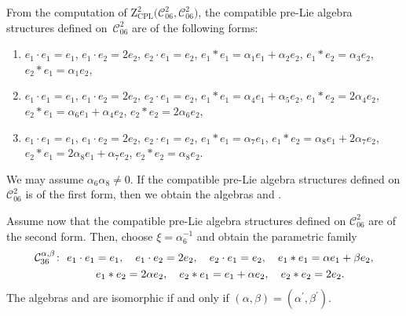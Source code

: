 \documentclass[pdftex]{sigma}
\numberwithin{equation}{section}
\begin{document}
From the computation of $\mathrm{Z}_{\mathrm{CPL}}^{2}\bigl(\mathcal{C}_{06}^{2},%
\mathcal{C}_{06}^{2}\bigr)$, the compatible pre-Lie algebra structures defined on~$\mathcal{C}_{06}^{2}$ are of the following forms:
\begin{enumerate}\itemsep=0pt
\item[(1)] $e_{1}\cdot e_{1}=e_{1}$, $e_{1}\cdot e_{2}=2e_{2}$, $e_{2}\cdot
e_{1}=e_{2}$,
$e_{1}\ast e_{1}=\alpha _{1}e_{1}+\alpha _{2}e_{2}$, $e_{1}\ast
e_{2}=\alpha _{3}e_{2}$, $e_{2}\ast e_{1}=\alpha _{1}e_{2}$,

\item[(2)] $e_{1}\cdot e_{1}=e_{1}$, $e_{1}\cdot e_{2}=2e_{2}$, $e_{2}\cdot
e_{1}=e_{2}$, $e_{1}\ast e_{1}=\alpha _{4}e_{1}+\alpha _{5}e_{2}$, $e_{1}\ast
e_{2}=2\alpha _{4}e_{2}$, $e_{2}\ast e_{1}=\alpha _{6}e_{1}+\alpha
_{4}e_{2}$, $e_{2}\ast e_{2}=2\alpha _{6}e_{2}$,

\item[(3)] $e_{1}\cdot e_{1}=e_{1}$, $e_{1}\cdot e_{2}=2e_{2}$, $e_{2}\cdot
e_{1}=e_{2}$,
$e_{1}\ast e_{1}=\alpha _{7}e_{1}$, $e_{1}\ast e_{2}=\alpha
_{8}e_{1}+2\alpha _{7}e_{2}$, $e_{2}\ast e_{1}=2\alpha _{8}e_{1}+\alpha
_{7}e_{2}$, $e_{2}\ast e_{2}=\alpha _{8}e_{2}$.
\end{enumerate}

We may assume $\alpha _{6}\alpha _{8}\neq 0$.
If the compatible pre-Lie
algebra structures defined on $\mathcal{C}_{06}^{2}$ is of the first form,
then we obtain the algebras 
and .

Assume now that the
compatible pre-Lie algebra structures defined on $\mathcal{C}_{06}^{2}$ are
of the second form. Then, choose $\xi ={\alpha^{-1} _{6}}$ and obtain the
parametric family
\begin{gather*}
\mathcal{C}_{36}^{\alpha ,\beta } \colon \
e_{1}\cdot e_{1}=e_{1}, \quad e_{1}\cdot e_{2}=2e_{2}, \quad e_{2}\cdot
e_{1}=e_{2}, \quad e_{1}\ast e_{1}=\alpha e_{1}+\beta e_{2}, \\
\hphantom{\mathcal{C}_{36}^{\alpha ,\beta } \colon} \
 e_{1}\ast e_{2}=2\alpha e_{2}, \quad e_{2}\ast e_{1}=e_{1}+\alpha e_{2}, \quad e_{2}\ast e_{2}=2e_{2}.
\end{gather*}
The algebras \smash{$\mathcal{C}_{36}^{\alpha ,\beta }$} and  are isomorphic if and only if $(\alpha,\beta)= (\alpha^{\prime },\beta ^{\prime })$.
\end{document}
